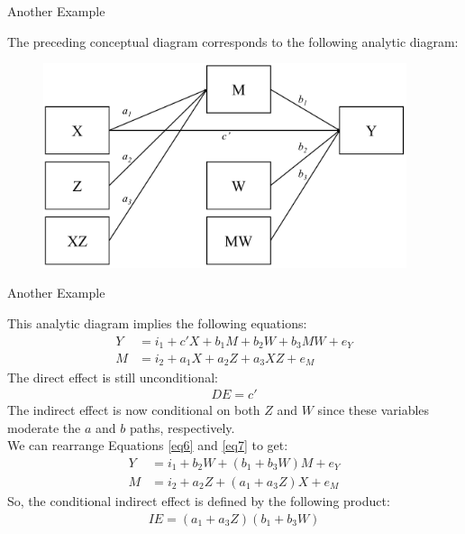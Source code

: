 \documentclass{beamer}
\newcommand{\va}[0]{\vspace{12pt}}
\newcommand{\vb}[0]{\vspace{6pt}}
\begin{document}
\begin{frame}{Another Example}
  
  The preceding conceptual diagram corresponds to the following
  analytic diagram: 
  \vb
  \begin{figure}
    \includegraphics[width=0.95\textwidth]{figures/modAwithZ_BwithWAnalytic.pdf}
  \end{figure}
  
\end{frame}



\begin{frame}{Another Example}
  
  This analytic diagram implies the following equations:
  \begin{align}
    Y &= i_1 + c'X + b_1M + b_2W + b_3MW + e_Y \label{eq6}\\
    M &= i_2 + a_1X + a_2Z + a_3XZ + e_M \label{eq7}
  \end{align}
  \pause
  The direct effect is still unconditional:
  \begin{align*}
    DE = c'
  \end{align*}
  \pause The indirect effect is now conditional on both $Z$ and $W$
  since these variables moderate the $a$ and $b$ paths,
  respectively.\\ 
  \va 
  \pause 
  We can rearrange Equations \ref{eq6} and \ref{eq7} to get:
  \begin{align*}
    Y &= i_1 + b_2W + \left( b_1 + b_3W \right)M + e_Y\\
    M &= i_2 + a_2Z + \left( a_1 + a_3Z \right)X + e_M
  \end{align*}
  So, the conditional indirect effect is defined by the following
  product:
  \begin{align*}
    IE = \left(a_1 + a_3Z \right) \left(b_1 + b_3W \right)
  \end{align*}
  
\end{frame}
\end{document}
